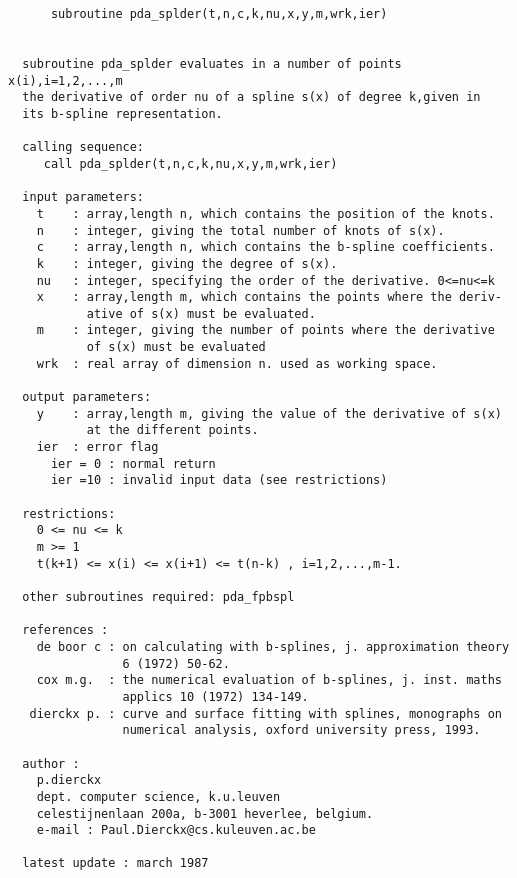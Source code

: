 \begin{verbatim}
      subroutine pda_splder(t,n,c,k,nu,x,y,m,wrk,ier)


  subroutine pda_splder evaluates in a number of points x(i),i=1,2,...,m
  the derivative of order nu of a spline s(x) of degree k,given in
  its b-spline representation.

  calling sequence:
     call pda_splder(t,n,c,k,nu,x,y,m,wrk,ier)

  input parameters:
    t    : array,length n, which contains the position of the knots.
    n    : integer, giving the total number of knots of s(x).
    c    : array,length n, which contains the b-spline coefficients.
    k    : integer, giving the degree of s(x).
    nu   : integer, specifying the order of the derivative. 0<=nu<=k
    x    : array,length m, which contains the points where the deriv-
           ative of s(x) must be evaluated.
    m    : integer, giving the number of points where the derivative
           of s(x) must be evaluated
    wrk  : real array of dimension n. used as working space.

  output parameters:
    y    : array,length m, giving the value of the derivative of s(x)
           at the different points.
    ier  : error flag
      ier = 0 : normal return
      ier =10 : invalid input data (see restrictions)

  restrictions:
    0 <= nu <= k
    m >= 1
    t(k+1) <= x(i) <= x(i+1) <= t(n-k) , i=1,2,...,m-1.

  other subroutines required: pda_fpbspl

  references :
    de boor c : on calculating with b-splines, j. approximation theory
                6 (1972) 50-62.
    cox m.g.  : the numerical evaluation of b-splines, j. inst. maths
                applics 10 (1972) 134-149.
   dierckx p. : curve and surface fitting with splines, monographs on
                numerical analysis, oxford university press, 1993.

  author :
    p.dierckx
    dept. computer science, k.u.leuven
    celestijnenlaan 200a, b-3001 heverlee, belgium.
    e-mail : Paul.Dierckx@cs.kuleuven.ac.be

  latest update : march 1987
\end{verbatim}



